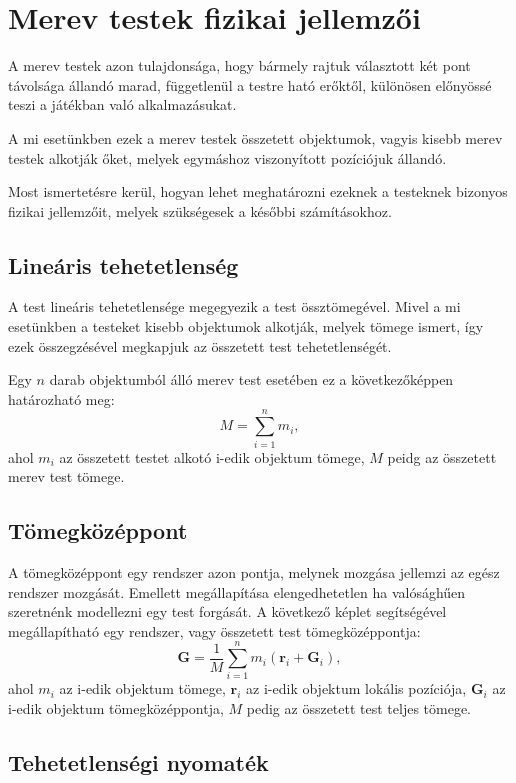 \documentclass[12pt]{report}
\begin{document}
\section{Merev testek fizikai jellemzői}

A merev testek azon tulajdonsága, hogy bármely rajtuk választott két pont távolsága állandó marad, függetlenül a testre ható erőktől, különösen előnyössé teszi a játékban való alkalmazásukat.

A mi esetünkben ezek a merev testek összetett objektumok, vagyis kisebb merev testek alkotják őket, melyek egymáshoz viszonyított pozíciójuk állandó.

Most ismertetésre kerül, hogyan lehet meghatározni ezeknek a testeknek bizonyos fizikai jellemzőit, melyek szükségesek a későbbi számításokhoz.

\subsection{Lineáris tehetetlenség}

A test lineáris tehetetlensége megegyezik a test össztömegével. Mivel a mi esetünkben a testeket kisebb objektumok alkotják, melyek tömege ismert, így ezek összegzésével megkapjuk az összetett test tehetetlenségét.

Egy $n$ darab objektumból álló merev test esetében ez a következőképpen határozható meg:
\[
    M = \sum_{i = 1}^{n} m_i,
\]
ahol $m_i$ az összetett testet alkotó i-edik objektum tömege, $M$ peidg az összetett merev test tömege.

\subsection{Tömegközéppont}

A tömegközéppont egy rendszer azon pontja, melynek mozgása jellemzi az egész rendszer mozgását. Emellett megállapítása elengedhetetlen ha valósághűen szeretnénk modellezni egy test forgását. A következő képlet segítségével megállapítható egy rendszer, vagy összetett test tömegközéppontja:
\[
    \mathbf{G} =
    \frac{1}{M} \sum_{i = 1}^{n} m_i (\mathbf{r}_i + \mathbf{G}_i),
\]
ahol $m_i$ az i-edik objektum tömege, $\mathbf{r}_i$ az i-edik objektum lokális pozíciója, $\mathbf{G}_i$ az i-edik objektum tömegközéppontja, $M$ pedig az összetett test teljes tömege.

\subsection{Tehetetlenségi nyomaték}
\end{document}
